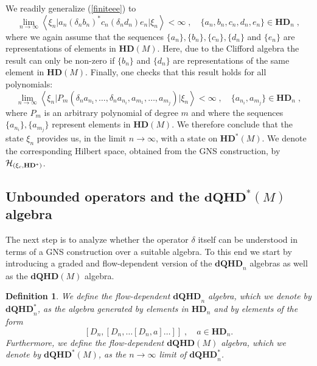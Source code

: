 \documentclass[12pt]{article}
\newcommand{\nn}{\nonumber}
\def\d{\delta}
\def\ch{{\cal H}}
\newtheorem{definition}[thm]{Definition}
\begin{document}
We readily generalize (\ref{finiteee}) to
\begin{equation}
\lim_{n\rightarrow\infty}\left\langle \xi_{n} \vert a_n (\d_n b_n)^* c_n (\d_n d_n) e_n \vert \xi_{n}\right\rangle < \infty \;,\quad  \{a_n,b_n,c_n,d_n,e_n\}\in \mathbf{HD}_n\;,
\nn%
\end{equation}
where we again assume that the sequences $\{a_n\},\{b_n\},\{c_n\},\{d_n\}$ and $\{e_n\}$ are representations of elements in $\mathbf{HD}(M)$. Here, due to the Clifford algebra the result can only be non-zero if $\{b_n\}$ and $\{d_n\}$ are representations of the same element in $\mathbf{HD}(M)$. Finally, one checks that this result holds for all polynomials: 
\begin{equation}
\lim_{n\rightarrow\infty}\left\langle \xi_{n} \vert  P_m(\d_n a_{n_1},\ldots,\d_n a_{n_i}, a_{m_1},\ldots,a_{m_j}) \vert \xi_{n}\right\rangle < \infty \;,\quad  \{a_{n_i},a_{m_j}\}\in \mathbf{HD}_n\;,
\nn%
\end{equation}
where $P_m$ is an arbitrary polynomial of degree $m$ and where
the sequences $\{a_{n_i}\},\{a_{m_j}\}$ represent elements in $\mathbf{HD}(M)$. We therefore conclude that the state $\xi_n$ provides us, in the limit $n\rightarrow\infty$, with a state on $\mathbf{HD^*}(M)$. We denote the corresponding Hilbert space, obtained from the GNS construction, by $\ch_{(\xi_c,\mathbf{HD^*})}$.\\









\subsection{Unbounded operators and the $\mathbf{dQHD}^*(M)$ algebra }


The next step is to analyze whether the operator $\d$ itself can be understood in terms of a GNS construction over a suitable algebra. To this end we start by introducing a graded and flow-dependent version of the $\mathbf{dQHD}_n$ algebras as well as the $\mathbf{dQHD}(M)$ algebra.



\begin{definition}
We define the flow-dependent $\mathbf{dQHD}_n$ algebra, which we denote by $\mathbf{dQHD}^*_n$, as the algebra generated by elements in $\mathbf{HD}_n$ and by elements of the form
$$
\left[D_n, \left[D_n, \ldots\left[ D_n, a\right]\ldots\right]\right]  \;,\quad a\in \mathbf{HD}_n.
$$
Furthermore, we define the flow-dependent $\mathbf{dQHD}(M)$ algebra, which we denote by $\mathbf{dQHD}^*(M)$, as the $n\rightarrow\infty$ limit of $\mathbf{dQHD}^{*}_n$. 


 \end{definition}
\end{document}
